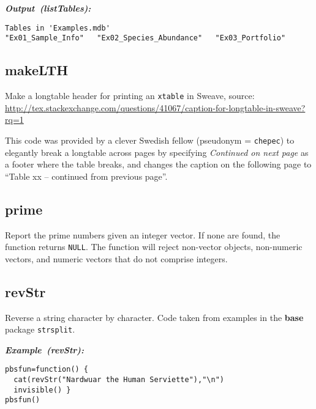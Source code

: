 \documentclass[letterpaper,12pt,fleqn]{article}
\def\tab{\hspace{0.5 in}}
\newcommand{\code}[1]{\small\texttt{#1}\normalsize}
\newcommand{\pkg}[1]{{\bf #1}}
\newcommand{\dQuote}[1]{``#1''}
\newcommand\example[1]{    %
	\textbf{\emph{Example~(#1):}}\\ \vspace{3 pt}
}
\newcommand\results[1]{    %
	\textbf{\emph{Output~(#1):}}\\ \vspace{3 pt}
}
\begin{document}
\begin{outputbox}
\results{listTables}
\begin{Verbatim}[fontsize=\footnotesize]
Tables in 'Examples.mdb'
"Ex01_Sample_Info"   "Ex02_Species_Abundance"   "Ex03_Portfolio"
\end{Verbatim}
\end{outputbox}

\subsection {makeLTH}

\tab Make a longtable header for printing an \code{xtable} in Sweave, source: \\
\url{http://tex.stackexchange.com/questions/41067/caption-for-longtable-in-sweave?rq=1}

\tab This code was provided by a clever Swedish fellow (pseudonym = \code{chepec}) to elegantly break a longtable across pages by specifying \emph{Continued on next page} as a footer where the table breaks, and changes the caption on the following page to \dQuote{Table xx -- continued from previous page}.

\subsection {prime}

\tab Report the prime numbers given an integer vector. If none are found, the function returns \code{NULL}. The function will reject non-vector objects, non-numeric vectors, and numeric vectors that do not comprise integers. 

\subsection {revStr}

\tab Reverse a string character by character. Code taken from examples in the \pkg{base} package \code{strsplit}.

\begin{examplebox}
\example{revStr}
\begin{Verbatim}[fontsize=\footnotesize]
pbsfun=function() {
  cat(revStr("Nardwuar the Human Serviette"),"\n")
  invisible() }
pbsfun()
\end{Verbatim}
\end{examplebox}
\end{document}
